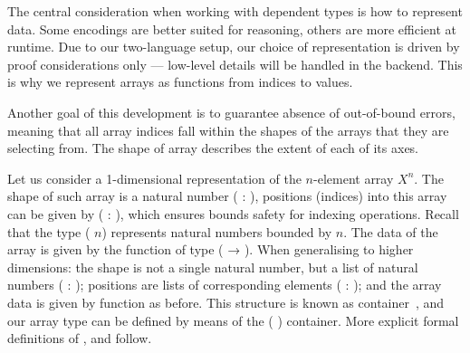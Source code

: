 The central consideration when working with dependent types is how to represent data.
Some encodings are better suited for reasoning, others are more efficient
at runtime.  Due to our two-language setup, our choice of
representation is driven by proof considerations only --- low-level
details will be handled in the backend.
This is why we represent arrays as functions from indices to values.

Another goal of this development is to guarantee absence of out-of-bound errors,
meaning that all array indices fall within the shapes of the arrays that
they are selecting from.  The shape of array describes the extent of each
of its axes.  

Let us consider a 1-dimensional representation of the $n$-element array
$X^n$.  The shape of such array is a natural number ( : ),
positions (indices) into this array can be given by
( :  ), which ensures bounds safety for indexing operations.
Recall that the type ( $n$) represents natural numbers bounded by $n$.
The data of the array is given by the function of type (  → ). 
When generalising to higher dimensions: the shape is not a single natural number,
but a list of natural numbers ( : ); positions are lists
of corresponding  elements ( :  ); and the
array data is given by function as before.  This structure is known
as container~\cite{cont1,cont2,ix-containers}, and our array type can
be defined by means of the (   ) container.
More explicit formal definitions of ,  and  follow.
